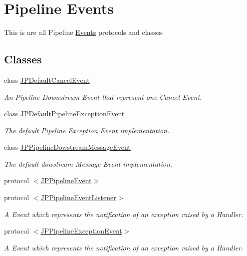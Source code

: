 \hypertarget{a00082}{
\section{Pipeline Events}
\label{a00082}
}


This is are all Pipeline \hyperlink{a00005}{Events} protocols and classes.  


\subsection*{Classes}
\begin{DoxyCompactItemize}
\item 
class \hyperlink{a00007}{JPDefaultCancelEvent}
\begin{DoxyCompactList}\small\item\em An Pipeline Downstream Event that represent one Cancel Event. \item\end{DoxyCompactList}\item 
class \hyperlink{a00009}{JPDefaultPipelineExceptionEvent}
\begin{DoxyCompactList}\small\item\em The default Pipeline Exception Event implementation. \item\end{DoxyCompactList}\item 
class \hyperlink{a00017}{JPPipelineDowstreamMessageEvent}
\begin{DoxyCompactList}\small\item\em The default dowstream Message Event implementation. \item\end{DoxyCompactList}\item 
protocol \hyperlink{a00018}{$<$JPPipelineEvent$>$}
\item 
protocol \hyperlink{a00020}{$<$JPPipelineEventListener$>$}
\begin{DoxyCompactList}\small\item\em A Event which represents the notification of an exception raised by a Handler. \item\end{DoxyCompactList}\item 
protocol \hyperlink{a00022}{$<$JPPipelineExceptionEvent$>$}
\begin{DoxyCompactList}\small\item\em A Event which represents the notification of an exception raised by a Handler. \item\end{DoxyCompactList}\item 

\end{DoxyCompactItemize}
